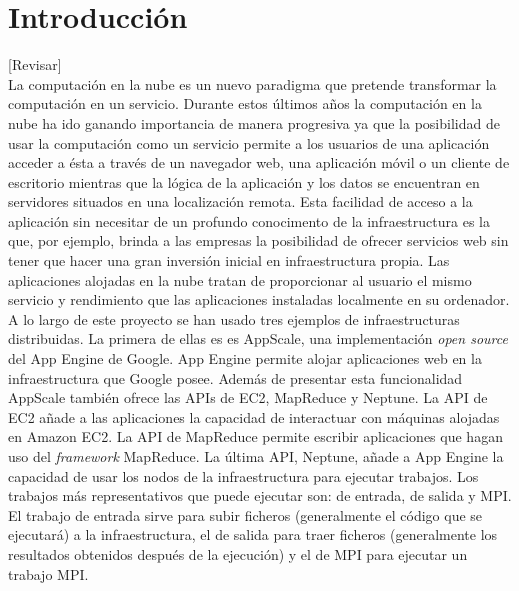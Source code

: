 \chapter{Introducción}
\label{cap:introduccion}

[Revisar]\\

La computación en la nube es un nuevo paradigma que pretende transformar la computación en un servicio. Durante estos últimos años la computación en la nube ha ido ganando importancia de manera progresiva ya que la posibilidad de usar la computación como un servicio permite a los usuarios de una aplicación acceder a ésta a través de un navegador web, una aplicación móvil o un cliente de escritorio mientras que la lógica de la aplicación y los datos se encuentran en servidores situados en una localización remota. Esta facilidad de acceso a la aplicación sin necesitar de un profundo conocimento de la infraestructura es la que, por ejemplo, brinda a las empresas la posibilidad de ofrecer servicios web sin tener que hacer una gran inversión inicial en infraestructura propia. Las aplicaciones alojadas en la nube tratan de proporcionar al usuario el mismo servicio y rendimiento que las aplicaciones instaladas localmente en su ordenador.\\

A lo largo de este proyecto se han usado tres ejemplos de infraestructuras distribuidas. La primera de ellas es es AppScale, una implementación \emph{open source} del App Engine de Google. App Engine permite alojar aplicaciones web en la infraestructura que Google posee. Además de presentar esta funcionalidad AppScale también ofrece las APIs de EC2, MapReduce y Neptune. La API de EC2 añade a las aplicaciones la capacidad de interactuar con máquinas alojadas en Amazon EC2. La API de MapReduce permite escribir aplicaciones que hagan uso del \emph{framework} MapReduce. La última API, Neptune, añade a App Engine la capacidad de usar los nodos de la infraestructura para ejecutar trabajos. Los trabajos más representativos que puede ejecutar son: de entrada, de salida y MPI. El trabajo de entrada sirve para subir ficheros (generalmente el código que se ejecutará) a la infraestructura, el de salida para traer ficheros (generalmente los resultados obtenidos después de la ejecución) y el de MPI para ejecutar un trabajo MPI.


